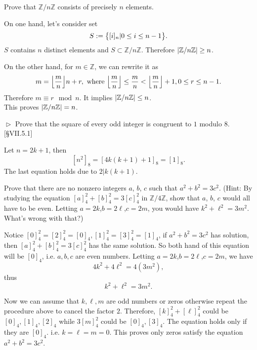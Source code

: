 \begin{problem}[2.10]
Prove that $\mathbb{Z}/n\mathbb{Z}$ consists of precisely $n$ elements.
\end{problem}

\begin{solution}
On one hand, let's consider set $$S:=\big{\{}[i]_n| 0\leq i\leq n-1\big{\}}.$$ $S$ contains $n$ distinct elements and $S\subset \mathbb{Z}/n\mathbb{Z}$. Therefore $\left|\mathbb{Z}/n\mathbb{Z}\right|\geq n$.

On the other hand, for $m\in\mathbb{Z}$, we can rewrite it as $$m = \floor*{\frac{m}{n}} n + r, \text{ where } \floor*{\frac{m}{n}}\leq \frac{m}{n} < \floor*{\frac{m}{n}} + 1, 0\leq r\leq n-1.$$ Therefore $m\equiv r \mod n$. It implies $\left|\mathbb{Z}/n\mathbb{Z}\right|\leq n$.\\
This proves $\left|\mathbb{Z}/n\mathbb{Z}\right|=n$.
\end{solution}


\begin{problem}[2.11]
 $\vartriangleright$ Prove that the square of every odd integer is congruent to $1$ modulo $8$.
[\S VII.5.1]
\end{problem}
\begin{solution}
Let $n = 2k+1$, then $$[n^2]_8=[4k(k+1) +1]_8 = [1]_8.$$ The last equation holds due to $2|k(k+1)$.
\end{solution}


\begin{problem}[2.12]
Prove that there are no nonzero integers $a$, $b$, $c$ such that $a^2+b^2 = 3c^2$. (Hint:
By studying the equation $[a]^2_4 + [b]^2_4 = 3[c]^2_4$
in $\mathbb{Z}/4\mathbb{Z}$, show that $a$, $b$, $c$ would all have to be even. 
Letting $a = 2k$,$b = 2\ell$,$c=2m$, you would have $k^2 +\ell^2=3m^2$.
What's wrong with that?)
\end{problem}
\begin{solution}
Notice $[0]^2_4 =[2]^2_4=[0]_4, [1]^2_4=[3]^2_4=[1]_4$, if $a^2+b^2 = 3c^2$ has solution, then $[a]_4^2+[b]^2_4 = 3[c]_4^2$ has the same solution.
So both hand of this equation will be $[0]_4$, i.e. $a,b,c$ are even numbers. Letting $a = 2k$,$b = 2\ell$,$c=2m$, we have
$$4k^2+4\ell^2=4(3m^2),$$ thus $$k^2 +\ell^2=3m^2.$$ 

Now we can assume that $k, \ell, m$ are odd numbers or zeros
otherwise repeat the procedure above to cancel the factor $2$. Therefore, $[k]^2_4+[\ell]^2_4$ could be $[0]_4, [1]_4, [2]_4$ while $3[m]^2_4$ could be $[0]_4,[3]_4$.
The equation holds only if they are $[0]_4$. i.e. $k=\ell=m=0$. This proves only zeros satisfy the equation $a^2+b^2 = 3c^2$.
\end{solution}


